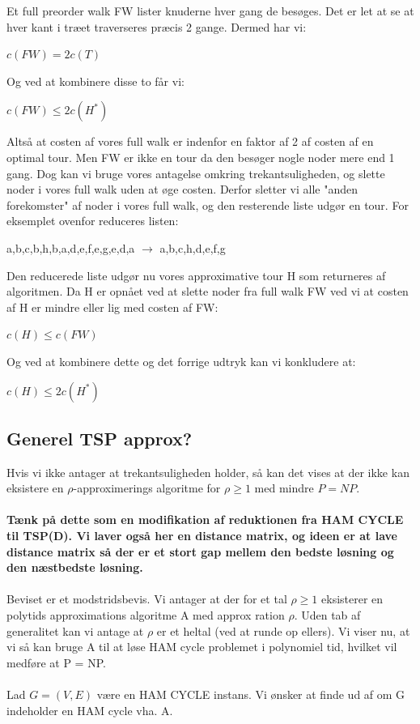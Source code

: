 \documentclass{article}
\begin{document}
Et full preorder walk FW lister knuderne hver gang de besøges. Det er let at se at hver kant i træet traverseres præcis 2 gange. Dermed har vi:
\begin{center}
	$c(FW) = 2c(T)$
\end{center}
Og ved at kombinere disse to får vi:
\begin{center}
	$c(FW) \le 2c(H^*)$ 
\end{center}
Altså at costen af vores full walk er indenfor en faktor af  2 af costen af en optimal tour. Men FW er ikke en tour da den besøger nogle noder mere end 1 gang. Dog kan vi bruge vores antagelse omkring trekantsuligheden, og slette noder i vores full walk uden at øge costen. Derfor sletter vi alle "anden forekomster" af noder i vores full walk, og den resterende liste udgør en tour. For eksemplet ovenfor reduceres listen:
\begin{center}
	a,b,c,b,h,b,a,d,e,f,e,g,e,d,a $\rightarrow$ a,b,c,h,d,e,f,g
\end{center}
Den reducerede liste udgør nu vores approximative tour H som returneres af algoritmen. Da H er opnået ved at slette noder fra full walk FW ved vi at costen af H er mindre eller lig med costen af FW:
\begin{center}
	$c(H) \le c(FW)$
\end{center}
Og ved at kombinere dette og det forrige udtryk kan vi konkludere at:
\begin{center}
	$c(H) \le 2c(H^*)$
\end{center}
\subsection{Generel TSP approx?}
Hvis vi ikke antager at trekantsuligheden holder, så kan det vises at der ikke kan eksistere en $\rho$-approximerings algoritme for $\rho \ge 1$ med mindre $P = NP$.\\\\
\textbf{Tænk på dette som en modifikation af reduktionen fra HAM CYCLE til TSP(D). Vi laver også her en distance matrix, og ideen er at lave distance matrix så der er et stort gap mellem den bedste løsning og den næstbedste løsning. }\\\\
Beviset er et modstridsbevis. Vi antager at der for et tal $\rho \ge 1$ eksisterer en polytids approximations algoritme A med approx ration $\rho$. Uden tab af generalitet kan vi antage at $\rho$ er et heltal (ved at runde op ellers). Vi viser nu, at vi så kan bruge A til at løse HAM cycle problemet i polynomiel tid, hvilket vil medføre at P = NP.\\\\
Lad $G = (V,E)$ være en HAM CYCLE instans. Vi ønsker at finde ud af om G indeholder en HAM cycle vha. A. \\\\
\end{document}
